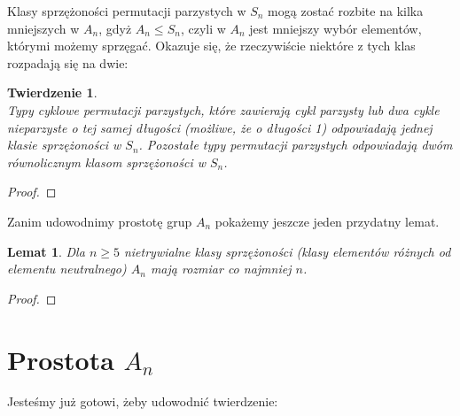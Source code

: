 \documentclass[licencjacka]{pracamgr}
\newtheorem{thh}{Twierdzenie}[section]
\newtheorem{lemma}{Lemat}[section]
\begin{document}
Klasy sprzężoności permutacji parzystych w $S_n$ mogą zostać rozbite na kilka mniejszych w $A_n$, 
gdyż $A_n \le S_n$, czyli w $A_n$ jest mniejszy wybór elementów, którymi możemy sprzęgać.
Okazuje się, że rzeczywiście niektóre z tych klas rozpadają się na dwie:

\begin{thh}\label{thm_o_klasach_A_n} $ $ \\
	Typy cyklowe permutacji parzystych, które zawierają cykl parzysty lub dwa cykle nieparzyste o tej samej długości (możliwe, że o długości 1)
	odpowiadają jednej klasie sprzężoności w $S_n$.
	Pozostałe typy permutacji parzystych odpowiadają dwóm równolicznym klasom sprzężoności w $S_n$.
\end{thh}
\begin{proof}
\end{proof}

Zanim udowodnimy prostotę grup $A_n$ pokażemy jeszcze jeden przydatny lemat.

\begin{lemma}\label{lemma_big_con}
	Dla $n \ge 5$ nietrywialne klasy sprzężoności (klasy elementów różnych od elementu neutralnego) $A_n$ mają rozmiar co najmniej $n$.
\end{lemma}
\begin{proof}
\end{proof}


\section{Prostota $A_n$}

Jesteśmy już gotowi, żeby udowodnić twierdzenie:
\end{document}
